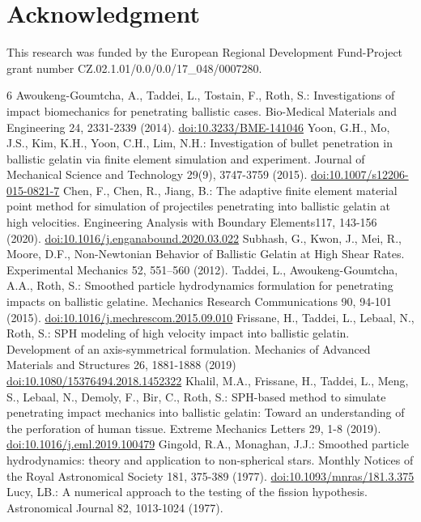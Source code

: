 \documentclass{svproc}
\newcommand{\revb}[1]{{\color{black}#1}}
\begin{document}
\section*{Acknowledgment}
%
This research was funded by the European Regional Development Fund-Project grant number CZ.02.1.01/0.0/0.0/17\_048/0007280.
%
\begin{thebibliography}{6}
%
Awoukeng-Goumtcha, A., Taddei, L., Tostain, F., Roth, S.: Investigations of impact biomechanics for penetrating ballistic cases. Bio-Medical Materials and Engineering 24, 2331-2339 (2014).
\url{doi:10.3233/BME-141046}
%
Yoon, G.H., Mo, J.S., Kim, K.H., Yoon, C.H., Lim, N.H.: Investigation of bullet penetration in ballistic gelatin via finite element simulation and experiment. Journal of Mechanical Science and Technology 29(9), 3747-3759 (2015).
\url{doi:10.1007/s12206-015-0821-7}
%
Chen, F., Chen, R., Jiang, B.: The adaptive finite element material point method for simulation of projectiles penetrating into ballistic gelatin at high velocities. Engineering Analysis with Boundary Elements117, 143-156 (2020).
\url{doi:10.1016/j.enganabound.2020.03.022}
%
\revb{
Subhash, G., Kwon, J., Mei, R., Moore, D.F., Non-Newtonian Behavior of Ballistic Gelatin
at High Shear Rates. Experimental Mechanics 52, 551–560 (2012).
}
%
Taddei, L., Awoukeng-Goumtcha, A.A., Roth, S.: Smoothed particle hydrodynamics formulation for penetrating impacts on ballistic gelatine. Mechanics Research Communications 90, 94-101 (2015).
\url{doi:10.1016/j.mechrescom.2015.09.010}
%
Frissane, H., Taddei, L., Lebaal, N., Roth, S.: SPH modeling of high velocity impact into ballistic gelatin. Development of an axis-symmetrical formulation. Mechanics of Advanced Materials and Structures 26, 1881-1888 (2019)
\url{doi:10.1080/15376494.2018.1452322}
%
Khalil, M.A., Frissane, H., Taddei, L., Meng, S., Lebaal, N., Demoly, F., Bir, C., Roth, S.: SPH-based method to simulate penetrating impact mechanics into ballistic gelatin: Toward an understanding of the perforation of human tissue. Extreme Mechanics Letters 29, 1-8 (2019).
\url{doi:10.1016/j.eml.2019.100479}
%
Gingold, R.A., Monaghan, J.J.: Smoothed particle hydrodynamics: theory and application to non-spherical stars. Monthly Notices of the Royal Astronomical Society 181, 375-389 (1977). 
\url{doi:10.1093/mnras/181.3.375}
%
Lucy, LB.: A numerical approach to the testing of the fission hypothesis. Astronomical Journal 82, 1013-1024 (1977). 

\end{thebibliography}
\end{document}
